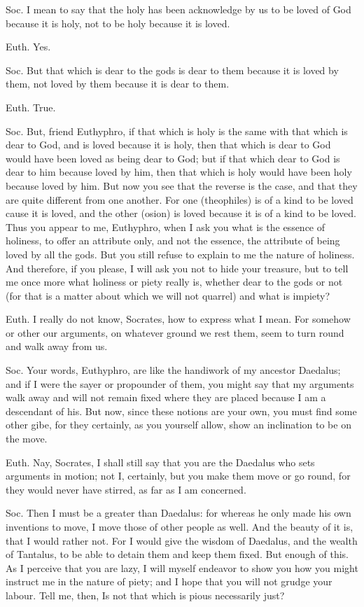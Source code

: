 Soc. I mean to say that the holy has been acknowledge by us to be loved of God because it is holy, not to be holy because it is loved.

Euth. Yes.

Soc. But that which is dear to the gods is dear to them because it is loved by them, not loved by them because it is dear to them.

Euth. True.

Soc. But, friend Euthyphro, if that which is holy is the same with that which is dear to God, and is loved because it is holy, then that which is dear to God would have been loved as being dear to God; but if that which dear to God is dear to him because loved by him, then that which is holy would have been holy because loved by him. But now you see that the reverse is the case, and that they are quite different from one another. For one (theophiles) is of a kind to be loved cause it is loved, and the other (osion) is loved because it is of a kind to be loved. Thus you appear to me, Euthyphro, when I ask you what is the essence of holiness, to offer an attribute only, and not the essence, the attribute of being loved by all the gods. But you still refuse to explain to me the nature of holiness. And therefore, if you please, I will ask you not to hide your treasure, but to tell me once more what holiness or piety really is, whether dear to the gods or not (for that is a matter about which we will not quarrel) and what is impiety?

Euth. I really do not know, Socrates, how to express what I mean. For somehow or other our arguments, on whatever ground we rest them, seem to turn round and walk away from us.

Soc. Your words, Euthyphro, are like the handiwork of my ancestor Daedalus; and if I were the sayer or propounder of them, you might say that my arguments walk away and will not remain fixed where they are placed because I am a descendant of his. But now, since these notions are your own, you must find some other gibe, for they certainly, as you yourself allow, show an inclination to be on the move.

Euth. Nay, Socrates, I shall still say that you are the Daedalus who sets arguments in motion; not I, certainly, but you make them move or go round, for they would never have stirred, as far as I am concerned.

Soc. Then I must be a greater than Daedalus: for whereas he only made his own inventions to move, I move those of other people as well. And the beauty of it is, that I would rather not. For I would give the wisdom of Daedalus, and the wealth of Tantalus, to be able to detain them and keep them fixed. But enough of this. As I perceive that you are lazy, I will myself endeavor to show you how you might instruct me in the nature of piety; and I hope that you will not grudge your labour. Tell me, then, Is not that which is pious necessarily just?

